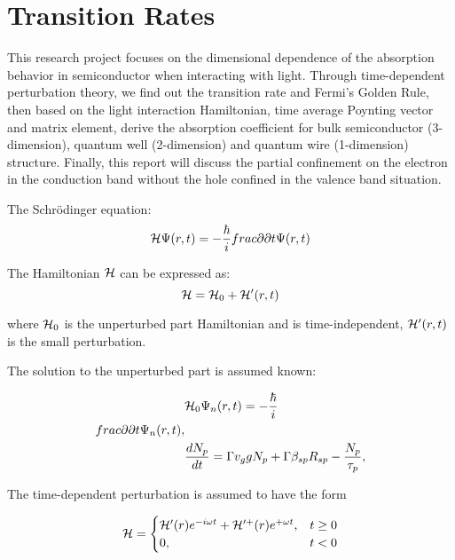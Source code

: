 \chapter{Transition Rates} \label{ch:rates} 

This research project focuses on the dimensional dependence of the absorption
behavior in semiconductor when interacting with light. Through time-dependent
perturbation theory, we find out the transition rate and Fermi’s Golden Rule,
then based on the light interaction Hamiltonian, time average Poynting vector
and matrix element, derive the absorption coefficient for bulk semiconductor
(3-dimension), quantum well (2-dimension) and quantum wire (1-dimension)
structure.  Finally, this report will discuss the partial confinement on the
electron in the conduction band without the hole confined in the valence band
situation.

The Schrödinger equation:
\begin{equation}
  \mathcal{H}\Psi(r,t) = - \frac{\hbar}{i}\\frac{\partial }{\partial t}\Psi(r,t)
\end{equation}

The Hamiltonian $\mathcal{H}$ can be expressed as:
\begin{equation}
  \mathcal{H} = \mathcal{H}_0 + \mathcal{H}^\prime(r,t)
\end{equation}

where $\mathcal{H}_0$ is the unperturbed part Hamiltonian and is time-independent, $\mathcal{H}^\prime(r,t)$ is the
small perturbation.

The solution to the unperturbed part is assumed known:

\begin{eqnarray}
\begin{aligned}
  & \HAM_0\Psi_n(r,t) = - \frac{\hbar}{i}\\frac{\partial }{\partial t}\Psi_n(r,t),
  \\
  & \frac{dN_p}{dt} = {\Gamma}v_g{g}N_p + \Gamma\beta_{sp}R_{sp} - \frac{N_p}{\tau_p},
\end{aligned}
\label{eq:eight}
\end{eqnarray}

The time-dependent perturbation is assumed to have the form

\begin{equation}
  \mathcal{H} = \begin{cases}
    \mathcal{H}^\prime(r)e^{-i\omega t} + \mathcal{H}^{\prime+}(r)e^{+\omega t}, & t \geq 0 \\
    0, & t < 0
  \end{cases}
\end{equation}

